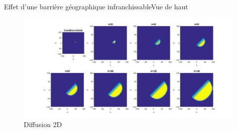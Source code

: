 \documentclass[10pt]{beamer}
\begin{document}
\begin{frame}{Effet d'une barrière géographique infranchissable}{Vue de haut}
\begin{figure}[H]
	\centering
	\includegraphics[width=0.9\linewidth]{SimulationKPP/Enviro/PolenordVueHaut}
	\caption{Diffusion 2D}
\end{figure}
\end{frame}
\end{document}
